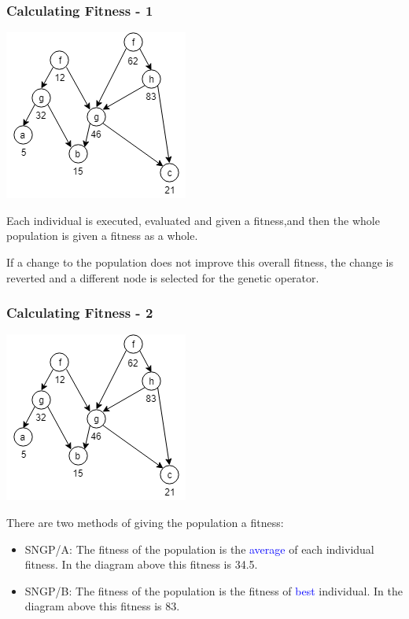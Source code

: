 \documentclass{beamer}
\newcommand{\blue}[1]{\textcolor{blue}{#1}}
\begin{document}
\begin{frame}
		\begin{frame}
			\frametitle{Calculating Fitness - 1}
			
			\begin{center}
			
				\includegraphics[scale=0.5]{resources/11_sngp_fitness}
				
				
			\end{center}
			
			Each individual is executed, evaluated and given a fitness,and then the whole population is given a fitness as a whole. 
			
			If a change to the population does not improve this overall fitness, the change is reverted and a different node is selected for the genetic operator.

		\end{frame}
	
		\begin{frame}
			\frametitle{Calculating Fitness - 2}
			
			\begin{center}
				
				\includegraphics[scale=0.5]{resources/11_sngp_fitness}
				
				
			\end{center}
			
			There are two methods of giving the population a fitness:
			
			\begin{itemize}
				\item SNGP/A: The fitness of the population is the \blue{average} of each individual fitness. In the diagram above this fitness is 34.5.
				\item SNGP/B: The fitness of the population is the fitness of \blue{best} individual. In the diagram above this fitness is 83.
			\end{itemize}
				

\end{frame}
\end{frame}
\end{document}
